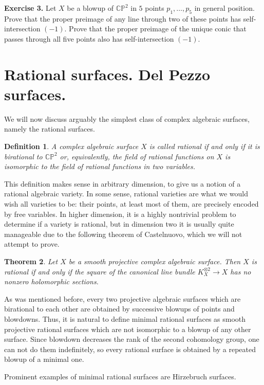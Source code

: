 \documentclass[11pt]{article}
\numberwithin{equation}{section}
\numberwithin{footnote}{section}
\newtheorem{thm}{Theorem}[section]
\newtheorem{defn}[thm]{Definition}
\newcommand{\blue}{\color{blue}}
\renewcommand{\P}{{\mathbb P}}
\newcommand{\C}{{\mathbb C}}
\begin{document}
{\bf Exercise 3.} Let $X$ be a blowup of $\C\P^2$ in $5$ points $p_1,\ldots, p_5$ in general position. Prove that 
the proper preimage of any line through two of these points has self-intersection $(-1)$. Prove that the proper preimage of the unique conic that passes through all five points also has self-intersection $(-1)$.


\section{Rational surfaces. Del Pezzo surfaces.}\label{sec.dP}
We will now discuss arguably the simplest class of complex algebraic surfaces, namely the {\blue rational} surfaces.

\smallskip
\begin{defn}
A complex algebraic surface $X$ is called {\blue rational} if and only if it is birational to $\C\P^2$ or, equivalently, the field of rational functions on $X$ is isomorphic to the field of rational functions in two variables.
\end{defn}

\smallskip
This definition makes sense in arbitrary dimension, to give us a notion of a rational algebraic variety. In some sense, rational varieties are what we would wish all varieties to be: their points, at least most of them, are precisely encoded by free variables. In higher dimension, it is a highly nontrivial problem to determine if a variety is rational, but in dimension two it is usually quite manageable due to the following theorem of Castelnuovo, which we will not attempt to prove.

\smallskip
\begin{thm}
Let $X$ be a smooth projective complex algebraic surface. Then $X$ is rational if and only if the square of the canonical line bundle $K_X^{\otimes 2}\to X$ has no nonzero holomorphic sections.
\end{thm}


As was mentioned before, every two projective algebraic surfaces which are birational to each other are obtained by successive blowups of points and blowdowns. Thus, it is natural to define {\blue minimal rational surfaces}  as smooth projective rational surfaces which are not isomorphic to a blowup of any other surface. Since blowdown decreases the rank of the second cohomology group, one can not do them indefinitely, so every rational surface is obtained by a repeated blowup of a minimal one.

\smallskip
Prominent examples of minimal rational surfaces are {\blue Hirzebruch surfaces.}
\end{document}
